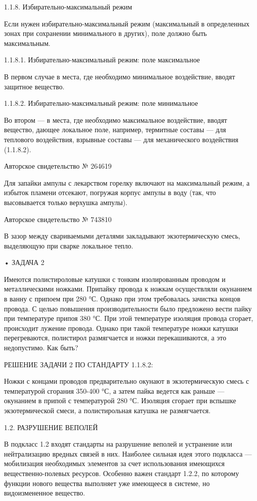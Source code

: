 1.1.8. Избирательно-максимальный режим

Если   нужен    избирательно-максимальный   режим    (максимальный   в
определенных зонах при сохранении  минимального в других), поле должно
быть максимальным.

1.1.8.1. Избирательно-максимальный режим: поле максимальное

В  первом  случае в  места,  где  необходимо минимальное  воздействие,
вводят защитное вещество.

1.1.8.2. Избирательно-максимальный режим: поле минимальное

Во втором —  в места, где необходимо  максимальное воздействие, вводят
вещество,  дающее  локальное  поле,   например,  термитные  составы  —
для  теплового  воздействия,  взрывные  составы  —  для  механического
воздействия (1.1.8.2).

Авторское свидетельство № 264619

Для  запайки  ампулы с  лекарством  горелку  включают на  максимальный
режим, а избыток пламени отсекают, погружая корпус ампулы в воду (так,
что высовывается только верхушка ампулы).

Авторское свидетельство № 743810

В зазор между свариваемыми деталями закладывают экзотермическую смесь,
выделяющую при сварке локальное тепло.


• ЗАДАЧА 2

Имеются  полистироловые  катушки  с тонким  изолированным  проводом  и
металлическими  ножками.   Припайку  провода  к   ножкам  осуществляли
окунанием в  ванну с припоем при  280 °С. Однако при  этом требовалась
зачистка  концов провода.  С целью  повышения производительности  было
предложено  вести  пайку  при  температуре припоя  380  °С.  При  этой
температуре  изоляция  провода  сгорает, происходит  лужение  провода.
Однако при  такой температуре ножки катушки  перегреваются, полистирол
размягчается и ножки перекашиваются, а это недопустимо. Как быть?


РЕШЕНИЕ ЗАДАЧИ 2 ПО СТАНДАРТУ 1.1.8.2:

Ножки  с концами  проводов  предварительно  окунают в  экзотермическую
смесь  с  температурой сгорания  350-400  °С,  а затем  пайка  ведется
как  раньше —  окунанием  в  припой с  температурой  280 °С.  Изоляция
сгорает при вспышке экзотермической смеси, а полистирольная катушка не
размягчается.

1.2. РАЗРУШЕНИЕ ВЕПОЛЕЙ

В подкласс 1.2 входят стандарты на разрушение веполей и устранение или
нейтрализацию  вредных  связей  в  них. Наиболее  сильная  идея  этого
подкласса —  мобилизация необходимых  элементов за  счет использования
имеющихся вещественно-полевых ресурсов. Особенно важен стандарт 1.2.2,
по которому функции нового вещества выполняет уже имеющееся в системе,
но видоизмененное вещество.

